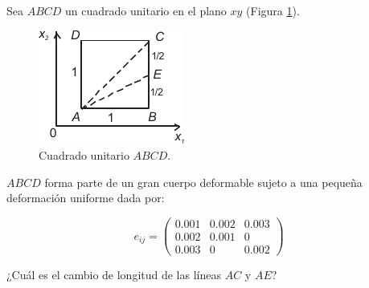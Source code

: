 \documentclass[a4paper,10pt,twoside,final,spanish]{article}
\begin{document}
Sea $ABCD$ un cuadrado unitario en el plano $xy$ (Figura \ref{fig:ej3}).

\begin{figure}[htbp]
\centerline{\includegraphics[scale=1.5]{ej3}}
\caption{Cuadrado unitario $ABCD$.}
\label{fig:ej3}
\end{figure}

$ABCD$ forma parte de un gran cuerpo deformable sujeto a una pequeña deformación uniforme dada por:

\[
e_{ij}=
\left(
\begin{matrix}
0.001 & 0.002 & 0.003 \\
0.002 & 0.001 & 0     \\
0.003 & 0     & 0.002
\end{matrix}
\right)
\]

¿Cuál es el cambio de longitud de las líneas $AC$ y $AE$?

\dotfill
\end{document}
